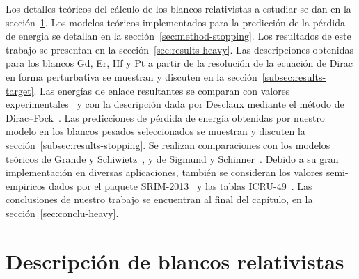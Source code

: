 
Los detalles teóricos del cálculo de los blancos relativistas a estudiar 
se dan en la sección~\ref{sec:method-target}. Los modelos teóricos 
implementados para la predicción de la pérdida de energia se detallan en 
la sección~\ref{sec:method-stopping}. Los resultados de este trabajo se 
presentan en la sección~\ref{sec:results-heavy}. Las descripciones 
obtenidas para los blancos Gd, Er, Hf y Pt a partir de la 
resolución de la ecuación de Dirac en forma perturbativa se muestran y 
discuten en la sección~\ref{subsec:results-target}. 
Las energías de enlace resultantes se comparan con valores 
experimentales~\cite{Williams:95} y con la descripción dada por 
Desclaux mediante el método de Dirac--Fock~\cite{Desclaux:73}. 
Las predicciones de pérdida de energía obtenidas por nuestro modelo en 
los blancos pesados seleccionados se muestran y discuten la
sección~\ref{subsec:results-stopping}. Se realizan comparaciones con los 
modelos teóricos de Grande y Schiwietz~\cite{Grande:01,casp52}, y de 
Sigmund y Schinner~\cite{DPASS20}. Debido a su gran implementación en 
diversas aplicaciones, también se consideran los valores semi-empiricos 
dados por el paquete SRIM-2013~\cite{Ziegler01} y las tablas 
ICRU-49~\cite{ICRU49}. Las conclusiones de nuestro trabajo se encuentran 
al final del capítulo, en la sección~\ref{sec:conclu-heavy}.

\section{Descripción de blancos relativistas}
\label{sec:method-target}


